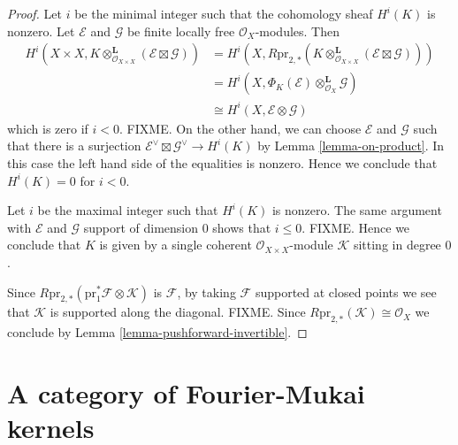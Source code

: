 \begin{proof}
Let $i$ be the minimal integer such that the cohomology sheaf $H^i(K)$ is
nonzero. Let $\mathcal{E}$ and $\mathcal{G}$ be finite locally free
$\mathcal{O}_X$-modules. Then
\begin{align*}
H^i(X \times X, K \otimes_{\mathcal{O}_{X \times X}}^\mathbf{L}
(\mathcal{E} \boxtimes \mathcal{G}))
& =
H^i(X, R\text{pr}_{2, *}(K \otimes_{\mathcal{O}_{X \times X}}^\mathbf{L}
(\mathcal{E} \boxtimes \mathcal{G}))) \\
& =
H^i(X, \Phi_K(\mathcal{E}) \otimes_{\mathcal{O}_X}^\mathbf{L} \mathcal{G}) \\
& \cong
H^i(X, \mathcal{E} \otimes \mathcal{G})
\end{align*}
which is zero if $i < 0$. FIXME. On the other hand, we can choose
$\mathcal{E}$ and $\mathcal{G}$ such that there is a surjection
$\mathcal{E}^\vee \boxtimes \mathcal{G}^\vee \to H^i(K)$
by Lemma \ref{lemma-on-product}.
In this case the left hand side of the equalities is nonzero.
Hence we conclude that $H^i(K) = 0$ for $i < 0$.

\medskip\noindent
Let $i$ be the maximal integer such that $H^i(K)$ is nonzero.
The same argument with $\mathcal{E}$ and $\mathcal{G}$
support of dimension $0$ shows that $i \leq 0$. FIXME.
Hence we conclude that $K$ is given by a single coherent
$\mathcal{O}_{X \times X}$-module $\mathcal{K}$ sitting in degree $0$.

\medskip\noindent
Since $R\text{pr}_{2, *}(\text{pr}_1^*\mathcal{F} \otimes \mathcal{K})$
is $\mathcal{F}$, by taking $\mathcal{F}$ supported at closed points
we see that $\mathcal{K}$ is supported along the diagonal. FIXME.
Since $R\text{pr}_{2, *}(\mathcal{K}) \cong \mathcal{O}_X$
we conclude by Lemma \ref{lemma-pushforward-invertible}.
\end{proof}








\section{A category of Fourier-Mukai kernels}
\label{section-category-Fourier-Mukai-kernels}

